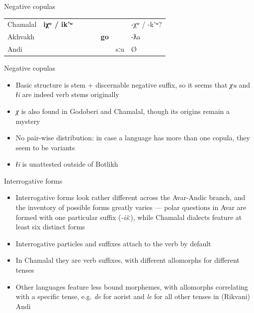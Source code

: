 \begin{frame}{Negative copulas}
\begin{table}[]
\begin{tabular}{l|llllll|l}
Chamalal                                                     & \textbf{iχʷ / ik'ʷ} &         &    &                           &                   &     & -χʷ / -k'ʷ?               \\
\rowcolor[HTML]{EFEFEF} 
Akhvakh &                     &         &    &                           & \textbf{go}       &     & -ƛa                     \\
Andi                                                         &                     &         &    &                           &                   & sːu & Ø                      
\end{tabular}
\end{table}
\end{frame}

\begin{frame}{Negative copulas}
\begin{itemize}
    \item Basic structure is stem + discernable negative suffix, so it seems that \textit{χu} and \textit{ɬi} are indeed verb stems originally
    \item \textit{χ} is also found in Godoberi and Chamalal, though its origins remain a mystery
    \item No pair-wise distribution: in case a language has more than one copula, they seem to be variants
    \item \textit{ɬi} is unattested outside of Botlikh
\end{itemize}
\end{frame}


\begin{frame}{Interrogative forms}
\begin{itemize}
    \item Interrogative forms look rather different across the Avar-Andic branch, and the inventory of possible forms greatly varies --- polar questions in Avar are formed with one particular suffix (\textit{-išː}), while Chamalal dialects feature at least six distinct forms
    \pause
    \item Interrogative particles and suffixes attach to the verb by default
    \item In Chamalal they are verb suffixes, with different allomorphs for different tenses \citep{bokarev1949}
    \item Other languages feature less bound morphemes, with allomorphs correlating with a specific tense, e.g. \textit{de} for aorist and \textit{le} for all other tenses in (Rikvani) Andi \citep{maisak2017}
\end{itemize}
\end{frame}

